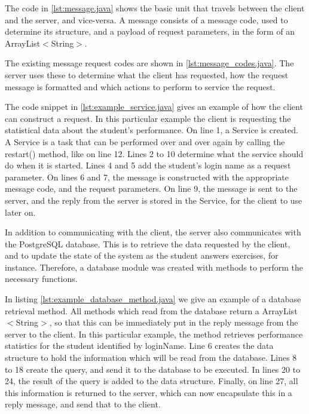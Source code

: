 
The code in \ref{lst:message.java} shows the basic unit that travels between the client and the server, and vice-versa. A message consists of a message code, used to determine its structure, and a payload of request parameters, in the form of an \textsf{ArrayList$<$String$>$}.\newline



The existing message request codes are shown in \ref{lst:message_codes.java}. The server uses these to determine what the client has requested, how the request message is formatted and which actions to perform to service the request. \newline



The code snippet in \ref{lst:example_service.java} gives an example of how the client can construct a request. In this particular example the client is requesting the statistical data about the student's performance. On line 1, a \textsf{Service} is created. A \textsf{Service} is a task that can be performed over and over again by calling the \textsf{restart()} method, like on line 12. Lines 2 to 10 determine what the service should do when it is started. Lines 4 and 5 add the student's login name as a request parameter. On lines 6 and 7, the message is constructed with the appropriate message code, and the request parameters. On line 9, the message is sent to the server, and the reply from the server is stored in the \textsf{Service}, for the client to use later on.\newline

In addition to communicating with the client, the server also communicates with the PostgreSQL database. This is to retrieve the data requested by the client, and to update the state of the system as the student answers exercises, for instance. Therefore, a database module was created with methods to perform the necessary functions. \newline

In listing \ref{lst:example_database_method.java} we give an example of a database retrieval method. All methods which read from the database return a \textsf{ArrayList$<$String$>$}, so that this can be immediately put in the reply message from the server to the client. In this particular example, the method retrieves performance statistics for the student identified by \textsf{loginName}. Line 6 creates the data structure to hold the information which will be read from the database. Lines 8 to 18 create the query, and send it to the database to be executed. In lines 20 to 24, the result of the query is added to the data structure. Finally, on line 27, all this information is returned to the server, which can now encapsulate this in a reply message, and send that to the client.\newline

